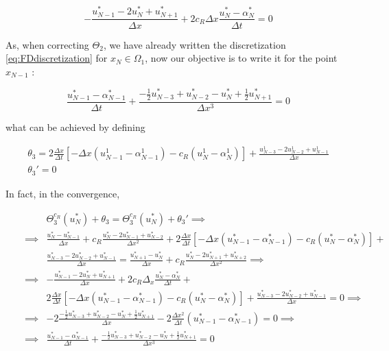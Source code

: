 \begin{equation}
-\frac{u_{N-1}^* - 2 u_{N}^* + u_{N+1}^*}{\Delta x} + 2c_R\Delta x\frac{u_N^* - \alpha_N^*}{\Delta t} = 0 
\end{equation}

\indent As, when correcting $\Theta_2$, we have already written the discretization \eqref{eq:FDdiscretization} for $x_N \in \Omega_1$, now our objective is to write it for the point $x_{N-1}$ :

\begin{equation}
    \label{eq:FDdiscretizationNm1}
    \frac{u_{N-1}^* - \alpha_{N-1}^*}{\Delta t} + \frac{-\frac{1}{2}u_{N-3}^* + u_{N-2}^* - u_{N}^* + \frac{1}{2}u_{N+1}^* }{\Delta x ^3} = 0
\end{equation}

\noindent what can be achieved by defining

\begin{equation}
\begin{gathered}
    \theta_3 = 2\frac{\Delta x}{\Delta t} \left[-\Delta x(u_{N-1}^1 - \alpha_{N-1}^1) - c_R (u_N^1 - \alpha_N^1) \right] + \frac{u_{N-3}^1 - 2u_{N-2}^1 + u_{N-1}^1}{\Delta x} \\
    \theta_3' = 0
\end{gathered}
\end{equation}

\indent In fact, in the convergence,

\begin{align*}
\label{eq:modifiedTBC3}
&&  &\Theta_3^{c_R}(u_N^*) + \theta_3 = \Theta_3^{c_R}(u_N^*) + \theta_3'     \implies \\
&& \implies & \frac{u_N^* - u_{N-1}^*}{\Delta x} + c_R \frac{u_N^* - 2u_{N-1}^* + u_{N-2}^*}{\Delta x^2} + 2\frac{\Delta x}{\Delta t}  \left[-\Delta x(u_{N-1}^* - \alpha_{N-1}^*) - c_R (u_N^* - \alpha_N^*) \right] + \\
&&   & 			\frac{u_{N-3}^* - 2u_{N-2}^* + u_{N-1}^*}{\Delta x}  =  \frac{u_{N+1}^* - u_{N}^*}{\Delta x} + c_R \frac{u_N^* - 2u_{N+1}^* + u_{N+2}^*}{\Delta x^2} \implies \\
&&  \implies &  -\frac{u_{N-1}^* - 2 u_{N}^* + u_{N+1}^*}{\Delta x} + 2c_R\Delta_x\frac{u_N^* - \alpha_N^*}{\Delta t} + \\
&&   & 2\frac{\Delta x}{\Delta t} \left[-\Delta x(u_{N-1}^* - \alpha_{N-1}^*) - c_R(u_N^* - \alpha_N^*) \right] + \frac{u_{N-3}^* - 2u_{N-2}^* + u_{N-1}^*}{\Delta x} = 0 \implies \\
&& \implies  & -2\frac{-\frac{1}{2}u_{N-3}^* + u_{N-2}^* - u_{N}^* + \frac{1}{2}u_{N+1}^* }{\Delta x} - 2\frac{\Delta x^2}{\Delta t}(u_{N-1}^* - 					\alpha_{N-1}^*) = 0 \implies \\
&& \implies &  \frac{u_{N-1}^* - \alpha_{N-1}^*}{\Delta t} + \frac{-\frac{1}{2}u_{N-3}^* + u_{N-2}^* - u_{N}^* + \frac{1}{2}u_{N+1}^* }{\Delta x ^3} = 0
\end{align*}

